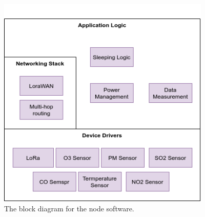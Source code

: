 \begin{figure}[H]
    \centering
    \includegraphics[width=4in]{"./figures/swNodeBD.png"} 
    \caption{The block diagram for the node software.}
    \label{fig:swNodeBD}
\end{figure}



